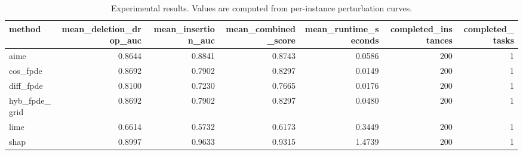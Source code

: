 \begin{table}[t]
\caption{Experimental results. Values are computed from per-instance perturbation curves.}
\label{tab:main_results_computed}
\centering
\begin{tabular}{lrrrrrr}
\toprule
method & mean\_deletion\_drop\_auc & mean\_insertion\_auc & mean\_combined\_score & mean\_runtime\_seconds & completed\_instances & completed\_tasks \\
\midrule
aime & 0.8644 & 0.8841 & 0.8743 & 0.0586 & 200 & 1 \\
cos\_fpde & 0.8692 & 0.7902 & 0.8297 & 0.0149 & 200 & 1 \\
diff\_fpde & 0.8100 & 0.7230 & 0.7665 & 0.0176 & 200 & 1 \\
hyb\_fpde\_grid & 0.8692 & 0.7902 & 0.8297 & 0.0480 & 200 & 1 \\
lime & 0.6614 & 0.5732 & 0.6173 & 0.3449 & 200 & 1 \\
shap & 0.8997 & 0.9633 & 0.9315 & 1.4739 & 200 & 1 \\
\bottomrule
\end{tabular}

\end{table}
